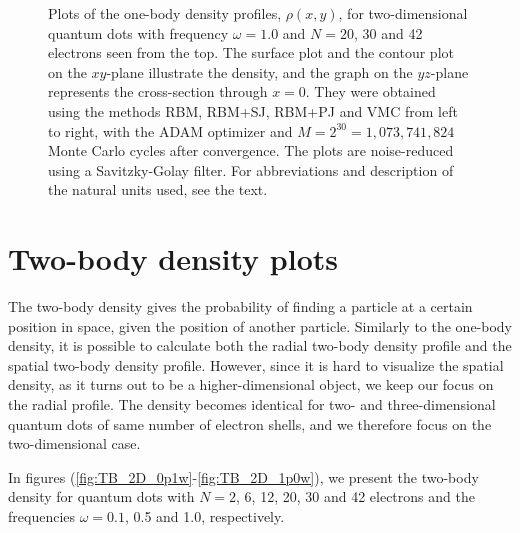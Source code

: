 \begin{landscape}
\begin{figure} [H]
		\caption{Plots of the one-body density profiles, $\rho(x,y)$, for two-dimensional quantum dots with frequency $\omega=1.0$ and $N=20$, 30 and 42 electrons seen from the top. The surface plot and the contour plot on the $xy$-plane illustrate the density, and the graph on the $yz$-plane represents the cross-section through $x=0$. They were obtained using the methods RBM, RBM+SJ, RBM+PJ and VMC from left to right, with the ADAM optimizer and $M=2^{30}=1,073,741,824$ Monte Carlo cycles after convergence. The plots are noise-reduced using a Savitzky-Golay filter. For abbreviations and description of the natural units used, see the text.}%
		\label{fig:OB2_interaction_large}
	\end{figure}
\end{landscape}

\newpage
\section{Two-body density plots} \label{sec:twobody}
The two-body density gives the probability of finding a particle at a certain position in space, given the position of another particle. Similarly to the one-body density, it is possible to calculate both the radial two-body density profile and the spatial two-body density profile. However, since it is hard to visualize the spatial density, as it turns out to be a higher-dimensional object, we keep our focus on the radial profile. The density becomes identical for two- and three-dimensional quantum dots of same number of electron shells, and we therefore focus on the two-dimensional case. 

In figures (\ref{fig:TB_2D_0p1w}-\ref{fig:TB_2D_1p0w}), we present the two-body density for quantum dots with $N=2$, 6, 12, 20, 30 and 42 electrons and the frequencies $\omega=0.1$, 0.5 and 1.0, respectively. 

